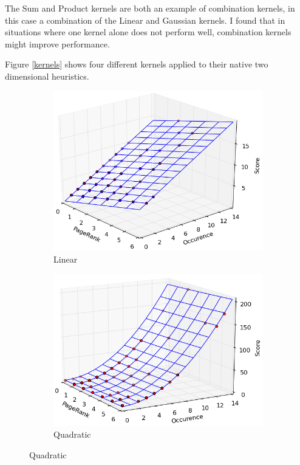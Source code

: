 \documentclass[12pt,notitlepage,twoside]{scrreprt}
\begin{document}
The Sum and Product kernels are both an example of combination kernels, in this case a
combination of the Linear and Gaussian kernels. I found that in situations
where one kernel alone does not perform well, combination kernels might improve performance.

Figure \ref{kernels} shows four different kernels applied to their native two dimensional heuristics. 
\begin{figure}[h!]
\centering
\begin{subfigure}[b]{.49\textwidth}
  \centering
  \includegraphics[width= \linewidth]{figs/lin.png}
  \caption{Linear}
  \label{lin}
\end{subfigure}
\begin{subfigure}[b]{.49\textwidth}
  \centering
  \includegraphics[width=\linewidth]{figs/quad.png}
  \caption{Quadratic}
  \label{quad}
\end{subfigure}


\end{figure}
\end{document}
